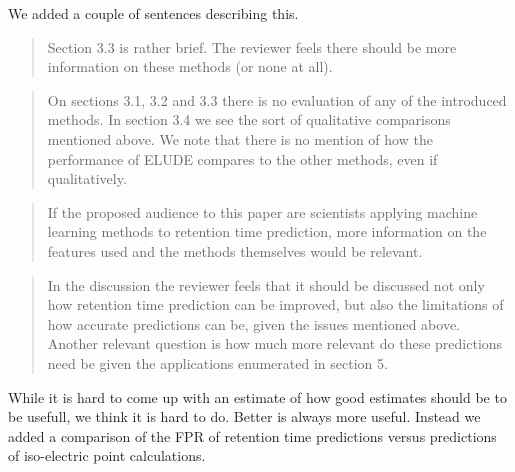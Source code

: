 \documentclass[letterpaper]{article}
\newcommand{\breview}{\begin{quotation}\begin{bf}\noindent}
\newcommand{\ereview}{\end{bf}\end{quotation}}
\begin{document}
We added a couple of sentences describing this.
\breview

Section 3.3 is rather brief. The reviewer feels there should be more information on these methods (or none at all).
\ereview
\breview


On sections 3.1, 3.2 and 3.3 there is no evaluation of any of the introduced methods. In section 3.4 we see the sort of qualitative comparisons mentioned above. We note that there is no mention of how the performance of ELUDE compares to the other methods, even if qualitatively.
\ereview
\breview

If the proposed audience to this paper are scientists applying machine learning methods to retention time prediction, more information on the features used and the methods themselves would be relevant. 
\ereview
\breview

In the discussion the reviewer feels that it should be discussed not
only how retention time prediction can be improved, but also the
limitations of how accurate predictions can be, given the issues
mentioned above. Another relevant question is how much more relevant
do these predictions need be given the applications enumerated in
section 5.

\ereview

While it is hard to come up with an estimate of how good estimates
should be to be usefull, we think it is hard to do. Better is always
more useful.  Instead we added a comparison of the FPR of retention
time predictions versus predictions of iso-electric point
calculations.
\end{document}
